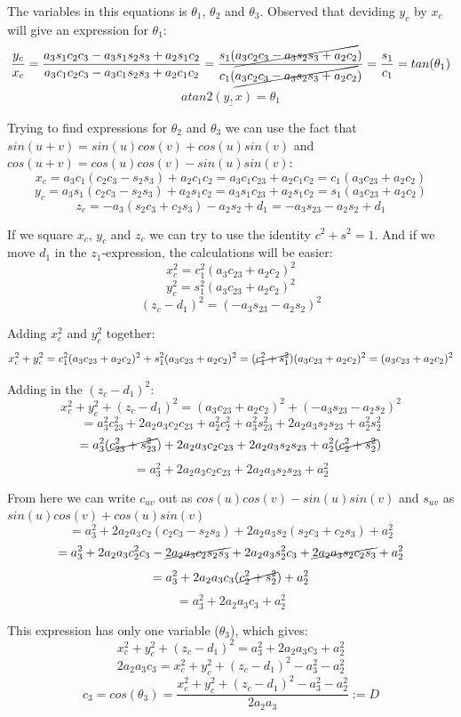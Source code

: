 \documentclass[12pt,norsk,a4paper]{article}
\begin{document}
    The variables in this equations is $\theta_1$, $\theta_2$ and $\theta_3$.
    Observed that deviding $y_c$ by $x_c$ will give an expression for $\theta_1$:\\
    \[\frac{y_c}{x_c } = \frac{a_3s_1c_2c_3-a_3s_1s_2s_3+a_2s_1c_2}{a_3c_1c_2c_3-a_3c_1s_2s_3+a_2c_1c_2} = \frac{s_1(\cancel{a_3c_2c_3-a_3s_2s_3+a_2c_2})}{c_1(\cancel{a_3c_2c_3-a_3s_2s_3+a_2c_2})} = \frac{s_1}{c_1} = tan(\theta_1)\]
    \[\underline{atan2(y,x) = \theta_1}\]

    Trying to find expressions for $\theta_2$ and $\theta_3$ we can use the fact that $sin(u+v) = sin(u)cos(v) + cos(u)sin(v)$ and $cos(u+v) = cos(u)cos(v)-sin(u)sin(v)$:
    \[x_c = a_3c_1(c_2c_3-s_2s_3)+a_2c_1c_2 = a_3c_1c_{23}+a_2c_1c_2 = c_1(a_3c_{23}+a_2c_2)\]
    \[y_c = a_3s_1(c_2c_3-s_2s_3)+a_2s_1c_2 = a_3s_1c_{23}+a_2s_1c_2 = s_1(a_3c_{23}+a_2c_2)\]
    \[z_c = -a_3(s_2c_3+c_2s_3)-a_2s_2+d_1 = -a_3s_{23}-a_2s_2+d_1\]

    If we square $x_c$, $y_c$ and $z_c$ we can try to use the identity $c^2+s^2 = 1$. And if we move $d_1$ in the $z_1$-expression, the calculations will be easier:
    \[x_c^2 = c_1^2(a_3c_{23}+a_2c_2)^2\]
    \[y_c^2 = s_1^2(a_3c_{23}+a_2c_2)^2\]
    \[(z_c-d_1)^2 = (-a_3s_{23}-a_2s_2)^2\]
  
    Adding $x_c^2$ and $y_c^2$ together:
    \[x_c^2+y_c^2 = c_1^2(a_3c_{23}+a_2c_2)^2 + s_1^2(a_3c_{23}+a_2c_2)^2 = (\cancel{c_1^2+s_1^2})(a_3c_{23}+a_2c_2)^2 = (a_3c_{23}+a_2c_2)^2\]
    
    Adding in the $(z_c-d_1)^2$:
    \[x_c^2+y_c^2+(z_c-d_1)^2 = (a_3c_{23}+a_2c_2)^2+(-a_3s_{23}-a_2s_2)^2\]
    \[=a_3^2c_{23}^2+2a_2a_3c_2c_{23}+a_2^2c_2^2 + a_3^2s_{23}^2 +2a_2a_3s_2s_{23}+ a_2^2s_2^2\]
    \[=a_3^2(\cancel{c_{23}^2+s_{23}^2})+ 2a_2a_3c_2c_{23}+2a_2a_3s_2s_{23} + a_2^2(\cancel{c_2^2+s_2^2})\]
    \[=a_3^2 + 2a_2a_3c_2c_{23}+2a_2a_3s_2s_{23} + a_2^2\]

    From here we can write $c_{uv}$ out as $cos(u)cos(v) -sin(u)sin(v)$ and $s_{uv}$ as $sin(u)cos(v) + cos(u)sin(v)$\\
    \[=a_3^2 + 2a_2a_3c_2(c_2c_3-s_2s_3)+2a_2a_3s_2(s_2c_3+c_2s_3) + a_2^2\]
    \[=a_3^2 + 2a_2a_3c_2^2c_3-\cancel{2a_2a_3c_2s_2s_3}+2a_2a_3s_2^2c_3+\cancel{2a_2a_3s_2c_2s_3} + a_2^2\]
    \[=a_3^2 + 2a_2a_3c_3(\cancel{c_2^2+s_2^2})+ a_2^2\]
    \[=a_3^2 + 2a_2a_3c_3+ a_2^2\]

    This expression has only one variable ($\theta_3$), which gives:
    \[x_c^2+y_c^2+(z_c-d_1)^2=a_3^2 + 2a_2a_3c_3+ a_2^2\]
    \[2a_2a_3c_3 = x_c^2+y_c^2+(z_c-d_1)^2-a_3^2-a_2^2\]
    \[c_3 = cos(\theta_3) = \frac{x_c^2+y_c^2+(z_c-d_1)^2-a_3^2-a_2^2}{2a_2a_3} := D\]
    
\end{document}

